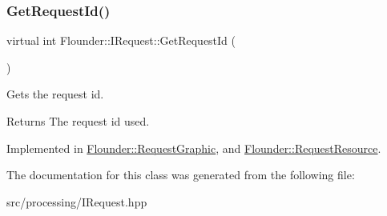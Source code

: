 \subsubsection{\texorpdfstring{Get\+Request\+Id()}{GetRequestId()}}
{\footnotesize\ttfamily virtual int Flounder\+::\+I\+Request\+::\+Get\+Request\+Id (\begin{DoxyParamCaption}{ }\end{DoxyParamCaption})\hspace{0.3cm}{\ttfamily [pure virtual]}}



Gets the request id. 

\begin{DoxyReturn}{Returns}
The request id used. 
\end{DoxyReturn}


Implemented in \hyperlink{class_flounder_1_1_request_graphic_a4480f0a81c8f8623619195cc6d87ef20}{Flounder\+::\+Request\+Graphic}, and \hyperlink{class_flounder_1_1_request_resource_ac116ffcad0790316a97603e874eb6586}{Flounder\+::\+Request\+Resource}.



The documentation for this class was generated from the following file\+:\begin{DoxyCompactItemize}
\item 
src/processing/I\+Request.\+hpp\end{DoxyCompactItemize}
